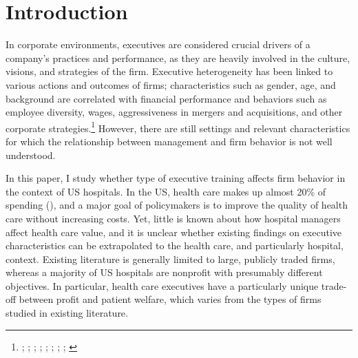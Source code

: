 \documentclass[12pt]{article}
\begin{document}
	\newpage

    \section{Introduction}

    In corporate environments, executives are considered crucial drivers of a company's practices and performance, as they are heavily involved in the culture, visions, and strategies of the firm. Executive heterogeneity has been linked to various actions and outcomes of firms; characteristics such as gender, age, and background are correlated with financial performance and behaviors such as employee diversity, wages, aggressiveness in mergers and acquisitions, and other corporate strategies.\footnote{\cite{bertrand2003managing}; \cite{matsa2011chipping}; \cite{matsa2011chipping}; \cite{adams2009women}; \cite{ahern2012changing}; \cite{flabbi2019female}; \cite{benmelech2015military}; \cite{custodio2013generalists}; \cite{frydman2019rising}} However, there are still settings and relevant characteristics for which the relationship between management and firm behavior is not well understood.

    In this paper, I study whether type of executive training affects firm behavior in the context of US hospitals. In the US, health care makes up almost 20\% of spending (\cite{CMS_National_Health_Expenditure}), and a major goal of policymakers is to improve the quality of health care without increasing costs. Yet, little is known about how hospital managers affect health care value, and it is unclear whether existing findings on executive characteristics can be extrapolated to the health care, and particularly hospital, context. Existing literature is generally limited to large, publicly traded firms, whereas a majority of US hospitals are nonprofit with presumably different objectives. In particular, health care executives have a particularly unique trade-off between profit and patient welfare, which varies from the types of firms studied in existing literature. 
    
\end{document}
